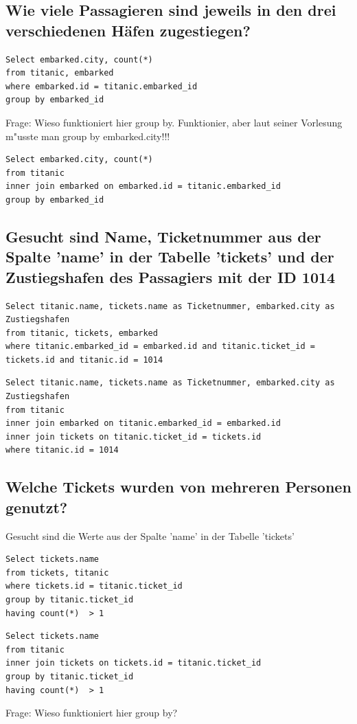 \documentclass[a4paper, 11pt, titlepage]{article}
\begin{document}
\subsection{Wie viele Passagieren sind jeweils in den drei verschiedenen Häfen zugestiegen?}
\begin{lstlisting}[style = sql]
Select embarked.city, count(*)
from titanic, embarked
where embarked.id = titanic.embarked_id
group by embarked_id
\end{lstlisting}
Frage: Wieso funktioniert hier group by. Funktionier, aber laut seiner Vorlesung m"usste man group by embarked.city!!!
\begin{lstlisting}[style = sql]
Select embarked.city, count(*)
from titanic 
inner join embarked on embarked.id = titanic.embarked_id
group by embarked_id
\end{lstlisting}
\subsection{Gesucht sind Name, Ticketnummer aus der Spalte 'name' in der Tabelle 'tickets'
und der Zustiegshafen des Passagiers mit der ID 1014}
\begin{lstlisting}[style = sql]
Select titanic.name, tickets.name as Ticketnummer, embarked.city as Zustiegshafen
from titanic, tickets, embarked
where titanic.embarked_id = embarked.id and titanic.ticket_id = tickets.id and titanic.id = 1014
\end{lstlisting}
\begin{lstlisting}[style = sql]
Select titanic.name, tickets.name as Ticketnummer, embarked.city as Zustiegshafen
from titanic
inner join embarked on titanic.embarked_id = embarked.id 
inner join tickets on titanic.ticket_id = tickets.id
where titanic.id = 1014
\end{lstlisting}
\subsection{Welche Tickets wurden von mehreren Personen genutzt?}
Gesucht sind die Werte aus der Spalte 'name' in der Tabelle 'tickets'
\begin{lstlisting}[style = sql]
Select tickets.name
from tickets, titanic
where tickets.id = titanic.ticket_id
group by titanic.ticket_id
having count(*)  > 1
\end{lstlisting}
\begin{lstlisting}[style = sql]
Select tickets.name
from titanic
inner join tickets on tickets.id = titanic.ticket_id
group by titanic.ticket_id
having count(*)  > 1
\end{lstlisting}
Frage: Wieso funktioniert hier group by?
\end{document}
